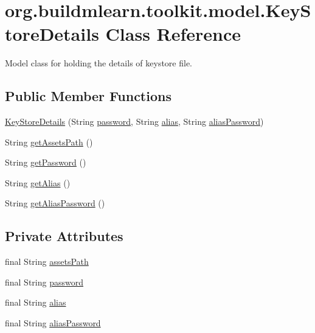 \hypertarget{classorg_1_1buildmlearn_1_1toolkit_1_1model_1_1KeyStoreDetails}{}\section{org.\+buildmlearn.\+toolkit.\+model.\+Key\+Store\+Details Class Reference}
\label{classorg_1_1buildmlearn_1_1toolkit_1_1model_1_1KeyStoreDetails}


Model class for holding the details of keystore file.  


\subsection*{Public Member Functions}
\begin{DoxyCompactItemize}
\item 
\hyperlink{classorg_1_1buildmlearn_1_1toolkit_1_1model_1_1KeyStoreDetails_aaf8ab4f6ddd374fd9e8071a845c7341c}{Key\+Store\+Details} (String \hyperlink{classorg_1_1buildmlearn_1_1toolkit_1_1model_1_1KeyStoreDetails_ae138d2646a7d55dad251cdeee6a62200}{password}, String \hyperlink{classorg_1_1buildmlearn_1_1toolkit_1_1model_1_1KeyStoreDetails_a92695ba27f2b424db39c8bc2e78361d5}{alias}, String \hyperlink{classorg_1_1buildmlearn_1_1toolkit_1_1model_1_1KeyStoreDetails_a2fc72dc42682805a6a2fa62e899a2a5c}{alias\+Password})
\item 
String \hyperlink{classorg_1_1buildmlearn_1_1toolkit_1_1model_1_1KeyStoreDetails_ab3f06172d5a670983b711d3b32c6b742}{get\+Assets\+Path} ()
\item 
String \hyperlink{classorg_1_1buildmlearn_1_1toolkit_1_1model_1_1KeyStoreDetails_afab09fb7d5ad40c70ce0e1c7df720eb5}{get\+Password} ()
\item 
String \hyperlink{classorg_1_1buildmlearn_1_1toolkit_1_1model_1_1KeyStoreDetails_a27f0dbd2433e3b1044b8fceda27ab4ac}{get\+Alias} ()
\item 
String \hyperlink{classorg_1_1buildmlearn_1_1toolkit_1_1model_1_1KeyStoreDetails_ac9f20a209c0509b7d19d9949a5ba7831}{get\+Alias\+Password} ()
\end{DoxyCompactItemize}
\subsection*{Private Attributes}
\begin{DoxyCompactItemize}
\item 
final String \hyperlink{classorg_1_1buildmlearn_1_1toolkit_1_1model_1_1KeyStoreDetails_a26f2d156f1f6cf648048c260764e8b1d}{assets\+Path}
\item 
final String \hyperlink{classorg_1_1buildmlearn_1_1toolkit_1_1model_1_1KeyStoreDetails_ae138d2646a7d55dad251cdeee6a62200}{password}
\item 
final String \hyperlink{classorg_1_1buildmlearn_1_1toolkit_1_1model_1_1KeyStoreDetails_a92695ba27f2b424db39c8bc2e78361d5}{alias}
\item 
final String \hyperlink{classorg_1_1buildmlearn_1_1toolkit_1_1model_1_1KeyStoreDetails_a2fc72dc42682805a6a2fa62e899a2a5c}{alias\+Password}
\end{DoxyCompactItemize}


